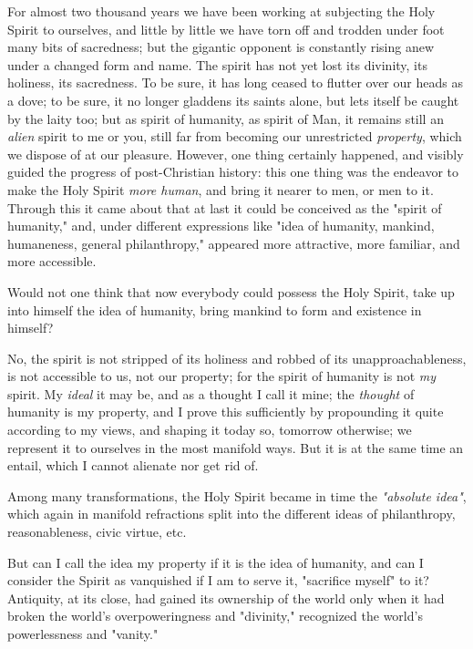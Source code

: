 \documentclass[a4paper]{book}
\begin{document}
For almost two thousand years we have been working at subjecting the Holy 
Spirit to ourselves, and little by little we have torn off and trodden under 
foot many bits of sacredness; but the gigantic opponent is constantly rising 
anew under a changed form and name. The spirit has not yet lost its divinity, 
its holiness, its sacredness. To be sure, it has long ceased to flutter over 
our heads as a dove; to be sure, it no longer gladdens its saints alone, but 
lets itself be caught by the laity too; but as spirit of humanity, as spirit 
of Man, it remains still an \textit{alien} spirit to me or you, still far from 
becoming our unrestricted \textit{property}, which we dispose of at our 
pleasure. However, one thing certainly happened, and visibly guided the 
progress of post-Christian history: this one thing was the endeavor to make 
the Holy Spirit \textit{more human}, and bring it nearer to men, or men to it. 
Through this it came about that at last it could be conceived as the "{}spirit 
of humanity,"{} and, under different expressions like "{}idea of humanity, 
mankind, humaneness, general philanthropy,"{} appeared more attractive, more 
familiar, and more accessible.

Would not one think that now everybody could possess the Holy Spirit, take up 
into himself the idea of humanity, bring mankind to form and existence in 
himself?

No, the spirit is not stripped of its holiness and robbed of its 
unapproachableness, is not accessible to us, not our property; for the spirit 
of humanity is not \textit{my} spirit. My \textit{ideal} it may be, and as a 
thought I call it mine; the \textit{thought} of humanity is my property, and I 
prove this sufficiently by propounding it quite according to my views, and 
shaping it today so, tomorrow otherwise; we represent it to ourselves in the 
most manifold ways. But it is at the same time an entail, which I cannot 
alienate nor get rid of.

Among many transformations, the Holy Spirit became in time the 
\textit{"{}absolute idea"{}}, which again in manifold refractions split into 
the different ideas of philanthropy, reasonableness, civic virtue, etc.

But can I call the idea my property if it is the idea of humanity, and can I 
consider the Spirit as vanquished if I am to serve it, "{}sacrifice myself"{} 
to it? Antiquity, at its close, had gained its ownership of the world only 
when it had broken the world's overpoweringness and "{}divinity,"{} recognized 
the world's powerlessness and "{}vanity."{}
\end{document}
